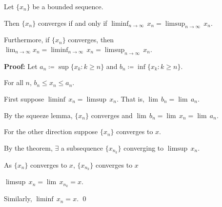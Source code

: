 \documentclass[10pt,aspectratio=149]{beamer}
\begin{document}
\begin{frame}
\begin{proposition}
Let $\{ x_n \}$ be a bounded sequence.

\pause
Then $\{ x_n \}$ converges
if and only if
\quad
$\displaystyle
\liminf_{n\to \infty} \, x_n = 
\limsup_{n\to \infty} \, x_n$.

\pause
Furthermore, if $\{ x_n \}$ converges, then
\quad
$\displaystyle
\lim_{n\to \infty} x_n = 
\liminf_{n\to \infty} \, x_n = 
\limsup_{n\to \infty} \, x_n$.
\end{proposition}

\pause
\textbf{Proof:}
Let $a_n \coloneqq \sup \{ x_k : k \geq n \}$ and $b_n \coloneqq \inf \{ x_k : k \geq n \}$.  

\pause
\medskip

For all $n$, \quad
$b_n \leq x_n \leq a_n$.

\pause
\medskip

First suppose $\liminf \, x_n = \limsup \, x_n$.  That is,
$\lim \, b_n = \lim \, a_n$.

\pause
\medskip

By the squeeze lemma,
$\{ x_n \}$ converges and
\quad $\displaystyle
\lim\, b_n
=
\lim\, x_n
=
\lim\, a_n$.

\pause
\medskip

For the other direction suppose $\{ x_n \}$ converges to $x$.

\pause
\medskip

By the theorem, $\exists$ a subsequence
$\{ x_{n_k} \}$ converging to $\limsup \, x_n$.

\pause
As $\{ x_n \}$ converges to $x$,
\quad $\{ x_{n_k} \}$ converges to $x$

\pause
\thus \quad $\limsup \, x_n = \lim\, x_{n_k} = x$.

\pause
\medskip

Similarly, $\liminf \, x_n = x$.
\qed


\end{frame}
\end{document}
